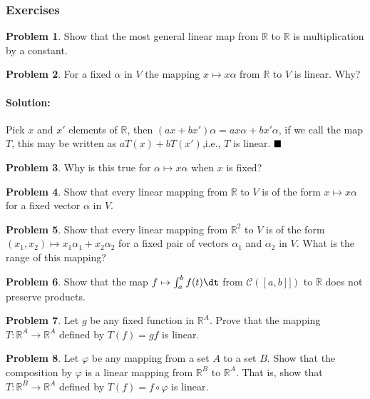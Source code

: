 \documentclass[]{article}
\newcommand{\RR}{\mathbb{R}}
\theoremstyle{definition}
\newtheorem{problem}{Problem}
\newenvironment{solution}{\paragraph{Solution:}}{\hfill$\blacksquare \\$}
\begin{document}
\subsubsection{Exercises}
\begin{problem}
Show that the most general linear map from $\RR$ to $\RR$ is multiplication by a constant.	
\end{problem}
\begin{problem}
	For a fixed $\alpha$ in $V$ the mapping $x \mapsto x \alpha$ from $\RR$ to $V$ is linear. Why?
\end{problem}
\begin{solution}
	Pick $x$ and $x'$ elements of $\RR$, then $(ax + bx')\alpha = ax\alpha + bx'\alpha$, if we call the map $T$, this may be written as $aT(x) + bT(x')$,i.e., $T$ is linear.
\end{solution}
\begin{problem}
	Why is this true for $\alpha \mapsto x\alpha$ when $x$ is fixed?
\end{problem}
\begin{problem}
	Show that every linear mapping from $\RR$ to $V$ is of the form $x \mapsto x \alpha$ for a fixed vector $\alpha$ in $V$.
\end{problem}
\begin{problem}
	Show that every linear mapping from $\RR^2$ to $V$ is of the form $(x_1, x_2) \mapsto x_1\alpha_1 + x_2\alpha_2$ for a fixed pair of vectors $\alpha_1$ and $\alpha_2$ in $V$. What is the range of this mapping?
\end{problem}
\begin{problem}
	Show that the map $f \mapsto \int_a^b f(t) \dt$ from $\mathcal{C}([a,b]])$ to $\RR$ does not preserve products.
\end{problem}
\begin{problem}
	Let $g$ be any fixed function in $\RR^A$. Prove that the mapping $T:\RR^A \to \RR^A$ defined by $T(f) = gf$ is linear.
\end{problem}
\begin{problem}
	Let $\varphi$ be any mapping from a set $A$ to a set $B$. Show that the composition by $\varphi$ is a linear mapping from $\RR^B$ to $\RR^A$. That is, show that $T:\RR^B \to \RR^A$ defined by $T(f) = f \circ \varphi $ is linear.	
\end{problem}
\end{document}
